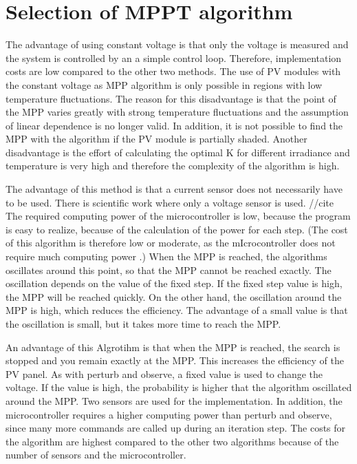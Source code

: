 \section{Selection of MPPT algorithm}\label{MPPTselection}

The advantage of using constant voltage is that only the voltage is measured and the system is controlled by an a simple control loop. Therefore, implementation costs are low compared to the other two methods. The use of PV modules with the constant voltage as MPP algorithm is only possible in regions with low temperature fluctuations. The reason for this disadvantage is that the point of the MPP varies greatly with strong temperature fluctuations and the assumption of linear dependence is no longer valid. In addition, it is not possible to find the MPP with the algorithm if the PV module is partially shaded.  Another disadvantage is the effort of calculating the optimal K for different irradiance and temperature is very high and therefore the complexity of the algorithm is high. 

The advantage of this method is that a current sensor does not necessarily have to be used. There is scientific work where only a voltage sensor is used. //cite{} The required computing power of the microcontroller is low, because the program is easy to realize, because of the calculation of the power for each step. (The cost of this algorithm is therefore low or moderate, as the mIcrocontroller does not require much computing power .) When the MPP is reached, the algorithms oscillates around this point, so that the MPP cannot be reached exactly. The oscillation depends on the value of the fixed step. If the fixed step value is high, the MPP will be reached quickly. On the other hand, the oscillation around the MPP is high, which reduces the efficiency. The advantage of a small value is that the oscillation is small, but it takes more time to reach the MPP.

An advantage of this Algrotihm is that when the MPP is reached, the search is stopped and you remain exactly at the MPP. This increases the efficiency of the PV panel. As with perturb and observe, a fixed value is used to change the voltage. If the value is high, the probability is higher that the algorithm oscillated around the MPP. 
Two sensors are used for the implementation. In addition, the microcontroller requires a higher computing power than perturb and observe, since many more commands are called up during an iteration step. The costs for the algorithm are highest compared to the other two algorithms because of the number of sensors and the microcontroller.

